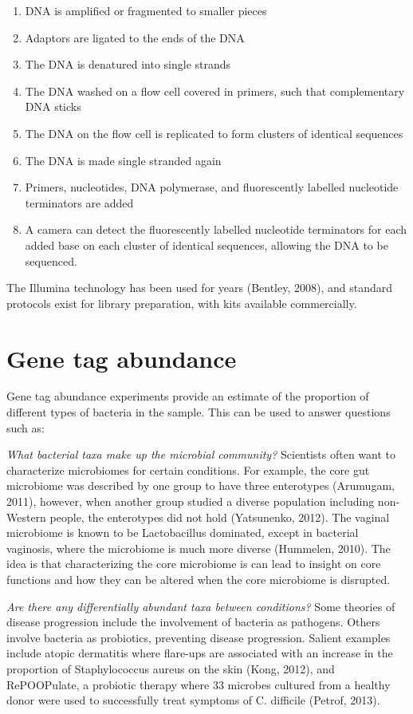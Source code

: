 \begin{enumerate}
\item DNA is amplified or fragmented to smaller pieces
\item Adaptors are ligated to the ends of the DNA
\item The DNA is denatured into single strands
\item The DNA washed on a flow cell covered in primers, such that complementary DNA sticks
\item The DNA on the flow cell is replicated to form clusters of identical sequences
\item The DNA is made single stranded again
\item Primers, nucleotides, DNA polymerase, and fluorescently labelled nucleotide terminators are added
\item A camera can detect the fluorescently labelled nucleotide terminators for each added base on each cluster of identical sequences, allowing the DNA to be sequenced.
\end{enumerate}

The Illumina technology has been used for years (Bentley, 2008), and standard protocols exist for library preparation, with kits available commercially.

\section{Gene tag abundance}
Gene tag abundance experiments provide an estimate of the proportion of different types of bacteria in the sample. This can be used to answer questions such as:

\textit{What bacterial taxa make up the microbial community?}
Scientists often want to characterize microbiomes for certain conditions. For example, the core gut microbiome was described by one group to have three enterotypes (Arumugam, 2011), however, when another group studied a diverse population including non-Western people, the enterotypes did not hold (Yatsunenko, 2012). The vaginal microbiome is known to be Lactobacillus dominated, except in bacterial vaginosis, where the microbiome is much more diverse (Hummelen, 2010). The idea is that characterizing the core microbiome is can lead to insight on core functions and how they can be altered when the core microbiome is disrupted.

\textit{Are there any differentially abundant taxa between conditions?}
Some theories of disease progression include the involvement of bacteria as pathogens. Others involve bacteria as probiotics, preventing disease progression. Salient examples include atopic dermatitis where flare-ups are associated with an increase in the proportion of Staphylococcus aureus on the skin (Kong, 2012), and RePOOPulate, a probiotic therapy where 33 microbes cultured from a healthy donor were used to successfully treat symptoms of C. difficile (Petrof, 2013).

